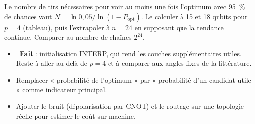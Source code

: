 \exercices
\begin{exercice}
Le nombre de tirs nécessaires pour voir au moins une fois l'optimum avec 95~\% de chances vaut $N=\ln0{,}05/\ln(1-P_{\text{opt}})$. Le calculer à 15 et 18 qubits pour $p=4$ (tableau), puis l'extrapoler à $n=24$ en supposant que la tendance continue. Comparer au nombre de chaînes $2^{24}$.
\end{exercice}

\begin{pistes}
\begin{itemize}
\item {}~\textbf{Fait} : initialisation INTERP, qui rend les couches supplémentaires utiles. Reste à aller au-delà de $p=4$ et à comparer aux angles fixes de la littérature.
\item Remplacer « probabilité de l'optimum » par « probabilité d'un candidat utile » comme indicateur principal.
\item Ajouter le bruit (dépolarisation par CNOT) et le routage sur une topologie réelle pour estimer le coût sur machine.
\end{itemize}
\end{pistes}
